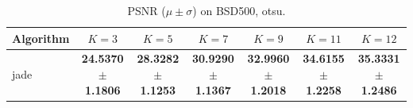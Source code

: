 \begin{table}[htbp]
\centering
\caption{PSNR ($\mu \pm \sigma$) on BSD500, otsu.}
\label{tab:exp1-otsu-psnr}
\begin{tabular}{lcccccc}
\toprule
Algorithm & $K=3$ & $K=5$ & $K=7$ & $K=9$ & $K=11$ & $K=12$ \\
\midrule
jade & \textbf{24.5370 $\pm$ 1.1806} & \textbf{28.3282 $\pm$ 1.1253} & \textbf{30.9290 $\pm$ 1.1367} & \textbf{32.9960 $\pm$ 1.2018} & \textbf{34.6155 $\pm$ 1.2258} & \textbf{35.3331 $\pm$ 1.2486} \\
\bottomrule
\end{tabular}
\end{table}